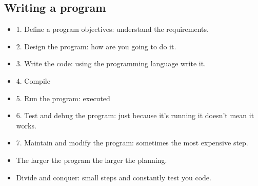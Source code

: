 \subsection{Writing a program}
\begin{itemize}[label=$\downarrow$]
   \item 1. Define a program objectives: understand the requirements.
   \item 2. Design the program: how are you going to do it.
   \item 3. Write the code: using the programming language write it. 
   \item 4. Compile 
   \item 5. Run the program: executed 
   \item 6. Test and debug the program: just because it's running it doesn't mean it works.
   \item 7. Maintain and modify the program: sometimes the most expensive step. 
\end{itemize}
\vspace{1cm}
\begin{itemize}
    \item The larger the program the larger the planning. 
    \item Divide and conquer: small steps and constantly test you code. 
\end{itemize}



